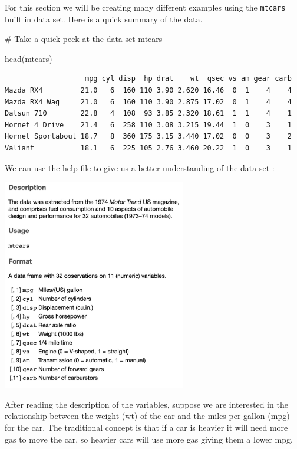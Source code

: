 \documentclass[
  letterpaper,
  DIV=11,
  numbers=noendperiod]{scrreprt}
\newenvironment{Shaded}{\begin{snugshade}}{\end{snugshade}}
\newcommand{\CommentTok}[1]{\textcolor[rgb]{0.37,0.37,0.37}{#1}}
\newcommand{\FunctionTok}[1]{\textcolor[rgb]{0.28,0.35,0.67}{#1}}
\newcommand{\NormalTok}[1]{\textcolor[rgb]{0.00,0.23,0.31}{#1}}
\begin{document}
For this section we will be creating many different examples using the
\texttt{mtcars} built in data set. Here is a quick summary of the data.

\begin{Shaded}
\begin{Highlighting}[]
\CommentTok{\# Take a quick peek at the data set mtcars}

\FunctionTok{head}\NormalTok{(mtcars)}
\end{Highlighting}
\end{Shaded}

\begin{verbatim}
                   mpg cyl disp  hp drat    wt  qsec vs am gear carb
Mazda RX4         21.0   6  160 110 3.90 2.620 16.46  0  1    4    4
Mazda RX4 Wag     21.0   6  160 110 3.90 2.875 17.02  0  1    4    4
Datsun 710        22.8   4  108  93 3.85 2.320 18.61  1  1    4    1
Hornet 4 Drive    21.4   6  258 110 3.08 3.215 19.44  1  0    3    1
Hornet Sportabout 18.7   8  360 175 3.15 3.440 17.02  0  0    3    2
Valiant           18.1   6  225 105 2.76 3.460 20.22  1  0    3    1
\end{verbatim}

We can use the help file to give us a better understanding of the data
set :

\includegraphics[width=0.6\textwidth,height=\textheight]{./images/AST_1.jpg}

After reading the description of the variables, suppose we are
interested in the relationship between the weight (wt) of the car and
the miles per gallon (mpg) for the car. The traditional concept is that
if a car is heavier it will need more gas to move the car, so heavier
cars will use more gas giving them a lower mpg.
\end{document}
